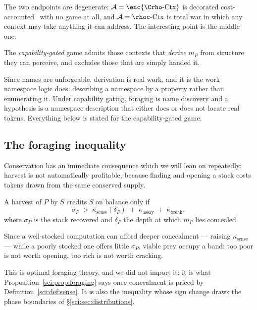 The two endpoints are degenerate: $\mathcal{A} = \enc{\Crho\text{-}\mathrm{Ctx}}$ is decorated
cost-accounted \rhoc\ with no game at all, and $\mathcal{A} = \rhoc\text{-}\mathrm{Ctx}$ is total war
in which any context may take anything it can address. The interesting point is the middle one:

\begin{definition}\label{sci:capability-gating}
The \emph{capability-gated} game admits those contexts that \emph{derive} $m_P$ from structure they
can perceive, and excludes those that are simply handed it.
\end{definition}

Since names are unforgeable, derivation is real work, and it is the work namespace logic does:
describing a namespace by a property rather than enumerating it. Under capability gating, foraging is
name discovery and a hypothesis is a namespace description that either does or does not locate real
tokens. Everything below is stated for the capability-gated game.

\subsection{The foraging inequality}\label{sci:S7.4}

Conservation has an immediate consequence which we will lean on repeatedly: harvest is not
automatically profitable, because finding and opening a stack costs tokens drawn from the same
conserved supply.

\begin{proposition}
\label{sci:prop:foraging}
A harvest of $P$ by $S$ credits $S$ on balance only if
\[
\sigma_P \;>\; \kappa_{\mathrm{sense}}(\delta_P) \;+\; \kappa_{\mathrm{assay}} \;+\;
\kappa_{\mathrm{break}},
\]
where $\sigma_P$ is the stack recovered and $\delta_P$ the depth at which $m_P$ lies concealed.
\end{proposition}

\begin{corollary}
\label{sci:cor:band}
Since a well-stocked computation can afford deeper concealment --- raising $\kappa_{\mathrm{sense}}$
--- while a poorly stocked one offers little $\sigma_P$, viable prey occupy a band: too poor is not
worth opening, too rich is not worth cracking.
\end{corollary}

This is optimal foraging theory, and we did not import it; it is what Proposition~\ref{sci:prop:foraging}
says once concealment is priced by Definition~\ref{sci:def:sense}. It is also the inequality whose sign
change draws the phase boundaries of \S\ref{sci:sec:distributions}.

